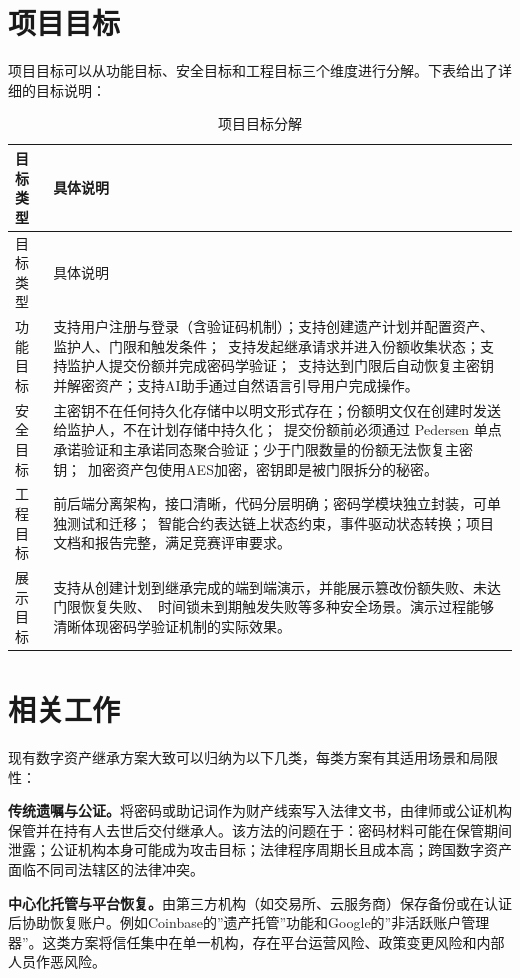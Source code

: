 \documentclass[UTF8,a4paper,zihao=-4,openany]{ctexrep}
\begin{document}
\section{项目目标}

项目目标可以从功能目标、安全目标和工程目标三个维度进行分解。下表给出了详细的目标说明：

\setlength{\extrarowheight}{4pt}
\begin{longtable}{p{3cm}p{11.4cm}}
\caption{项目目标分解}\\
\toprule
目标类型 & 具体说明\\
\midrule
\endfirsthead
\toprule
目标类型 & 具体说明\\
\midrule
\endhead
功能目标 & 支持用户注册与登录（含验证码机制）；支持创建遗产计划并配置资产、监护人、门限和触发条件；\ 支持发起继承请求并进入份额收集状态；支持监护人提交份额并完成密码学验证；\ 支持达到门限后自动恢复主密钥并解密资产；支持AI助手通过自然语言引导用户完成操作。\\
安全目标 & 主密钥不在任何持久化存储中以明文形式存在；份额明文仅在创建时发送给监护人，不在计划存储中持久化；\ 提交份额前必须通过 Pedersen 单点承诺验证和主承诺同态聚合验证；少于门限数量的份额无法恢复主密钥；\ 加密资产包使用AES加密，密钥即是被门限拆分的秘密。\\
工程目标 & 前后端分离架构，接口清晰，代码分层明确；密码学模块独立封装，可单独测试和迁移；\ 智能合约表达链上状态约束，事件驱动状态转换；项目文档和报告完整，满足竞赛评审要求。\\
展示目标 & 支持从创建计划到继承完成的端到端演示，并能展示篡改份额失败、未达门限恢复失败、\ 时间锁未到期触发失败等多种安全场景。演示过程能够清晰体现密码学验证机制的实际效果。\\
\bottomrule
\end{longtable}

\section{相关工作}

现有数字资产继承方案大致可以归纳为以下几类，每类方案有其适用场景和局限性：

\textbf{传统遗嘱与公证。}将密码或助记词作为财产线索写入法律文书，由律师或公证机构保管并在持有人去世后交付继承人。该方法的问题在于：密码材料可能在保管期间泄露；公证机构本身可能成为攻击目标；法律程序周期长且成本高；跨国数字资产面临不同司法辖区的法律冲突。

\textbf{中心化托管与平台恢复。}由第三方机构（如交易所、云服务商）保存备份或在认证后协助恢复账户。例如Coinbase的”遗产托管”功能和Google的”非活跃账户管理器”。这类方案将信任集中在单一机构，存在平台运营风险、政策变更风险和内部人员作恶风险。
\end{document}
